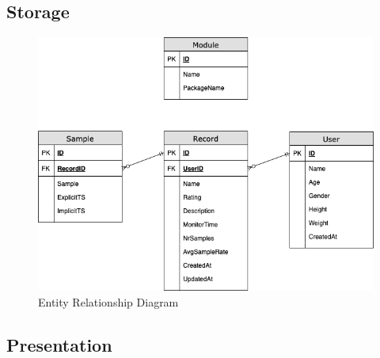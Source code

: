 \subsection{Storage}
\begin{figure}
    \centering
    \includegraphics[scale=0.55]{images/Storage_Imp.png}
    \caption{Entity Relationship Diagram}
    \label{fig:impl_modules}
\end{figure}


\subsection{Presentation}

